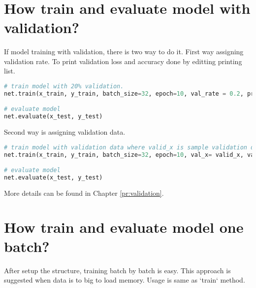 \documentclass[12pt]{report}
\begin{document}
\section{How train and evaluate model with validation?}
\paragraph{}
If model training with validation, there is two way to do it. First way assigning validation rate. To print validation loss and accuracy done by editting printing list. 

\begin{lstlisting}[language=Python, numbers=none, caption={Train and evaluate model with validation rate.}, label={ex:train-val-rate}]
# train model with 20% validation.
net.train(x_train, y_train, batch_size=32, epoch=10, val_rate = 0.2, printing=['loss', 'accuracy', 'val_loss', 'val_acc'])

# evaluate model
net.evaluate(x_test, y_test)

\end{lstlisting}

Second way is assigning validation data. 

\begin{lstlisting}[language=Python, numbers=none, caption={Train and evaluate model with validation data.}, label={ex:train-val-data}]
# train model with validation data where valid_x is sample validation data and valid_y is labels of them.
net.train(x_train, y_train, batch_size=32, epoch=10, val_x= valid_x, val_y=valid_y, printing=['loss', 'accuracy', 'val_loss', 'val_acc'])

# evaluate model
net.evaluate(x_test, y_test)

\end{lstlisting}

More details can be found in Chapter \ref{pr:validation}.




\section{How train and evaluate model one batch?}
\paragraph{}
After setup the structure, training batch by batch is easy. This approach is suggested when data is to big to load memory. Usage is same as `train` method.
\end{document}
